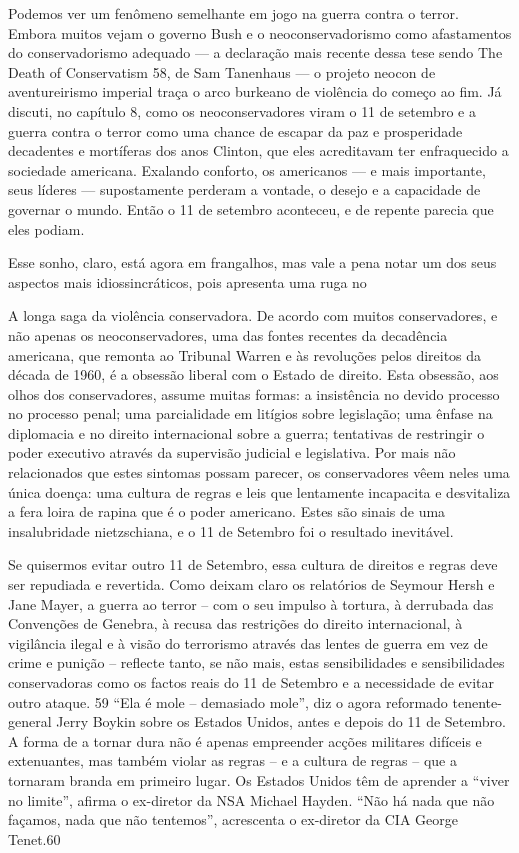  \par 
Podemos ver um fenômeno semelhante em jogo na guerra contra o terror. Embora muitos vejam o governo Bush e o neoconservadorismo como afastamentos do conservadorismo adequado — a declaração mais recente dessa tese sendo The Death of Conservatism 58, de Sam Tanenhaus — o projeto neocon de aventureirismo imperial traça o arco burkeano de violência do começo ao fim. Já discuti, no capítulo 8, como os neoconservadores viram o {\color{blue}11} de setembro e a guerra contra o terror como uma chance de escapar da paz e prosperidade decadentes e mortíferas dos anos Clinton, que eles acreditavam ter enfraquecido a sociedade americana. Exalando conforto, os americanos — e mais importante, seus líderes — supostamente perderam a vontade, o desejo e a capacidade de governar o mundo. Então o {\color{blue}11} de setembro aconteceu, e de repente parecia que eles podiam.
 \par 
Esse sonho, claro, está agora em frangalhos, mas vale a pena notar um dos seus aspectos mais idiossincráticos, pois apresenta uma ruga no
 \par 
A longa saga da violência conservadora. De acordo com muitos conservadores, e não apenas os neoconservadores, uma das fontes recentes da decadência americana, que remonta ao Tribunal Warren e às revoluções pelos direitos da década de 1960, é a obsessão liberal com o Estado de direito. Esta obsessão, aos olhos dos conservadores, assume muitas formas: a insistência no devido processo no processo penal; uma parcialidade em litígios sobre legislação; uma ênfase na diplomacia e no direito internacional sobre a guerra; tentativas de restringir o poder executivo através da supervisão judicial e legislativa. Por mais não relacionados que estes sintomas possam parecer, os conservadores vêem neles uma única doença: uma cultura de regras e leis que lentamente incapacita e desvitaliza a fera loira de rapina que é o poder americano. Estes são sinais de uma insalubridade nietzschiana, e o {\color{blue}11} de Setembro foi o resultado inevitável.
 \par 
Se quisermos evitar outro {\color{blue}11} de Setembro, essa cultura de direitos e regras deve ser repudiada e revertida. Como deixam claro os relatórios de Seymour Hersh e Jane Mayer, a guerra ao terror – com o seu impulso à tortura, à derrubada das Convenções de Genebra, à recusa das restrições do direito internacional, à vigilância ilegal e à visão do terrorismo através das lentes de guerra em vez de crime e punição – reflecte tanto, se não mais, estas sensibilidades e sensibilidades conservadoras como os factos reais do {\color{blue}11} de Setembro e a necessidade de evitar outro ataque. {\color{blue}59} “Ela é mole – demasiado mole”, diz o agora reformado tenente-general Jerry Boykin sobre os Estados Unidos, antes e depois do {\color{blue}11} de Setembro. A forma de a tornar dura não é apenas empreender acções militares difíceis e extenuantes, mas também violar as regras – e a cultura de regras – que a tornaram branda em primeiro lugar. Os Estados Unidos têm de aprender a “viver no limite”, afirma o ex-diretor da NSA Michael Hayden. “Não há nada que não façamos, nada que não tentemos”, acrescenta o ex-diretor da CIA George Tenet.{\color{blue}60}
